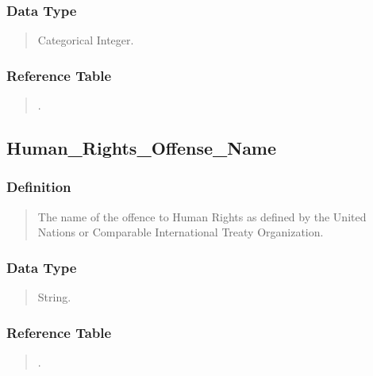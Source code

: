 \documentclass[letterpaper,10pt,english]{sphinxmanual}
\begin{document}
\subsubsection{Data Type}
\label{\detokenize{database_schema:id74}}\begin{quote}

\sphinxAtStartPar
Categorical Integer.
\end{quote}


\subsubsection{Reference Table}
\label{\detokenize{database_schema:id75}}\begin{quote}

\sphinxAtStartPar
{\hyperref[\detokenize{database_schema:human-rights-offense-table}]{}}.
\end{quote}


\subsection{Human\_Rights\_Offense\_Name}
\label{\detokenize{database_schema:human-rights-offense-name}}

\subsubsection{Definition}
\label{\detokenize{database_schema:id76}}\begin{quote}

\sphinxAtStartPar
The name of the offence to Human Rights as defined by the United Nations or Comparable International Treaty Organization.
\end{quote}


\subsubsection{Data Type}
\label{\detokenize{database_schema:id77}}\begin{quote}

\sphinxAtStartPar
String.
\end{quote}


\subsubsection{Reference Table}
\label{\detokenize{database_schema:id78}}\begin{quote}

\sphinxAtStartPar
{\hyperref[\detokenize{database_schema:human-rights-offense-table}]{}}.
\end{quote}
\end{document}

